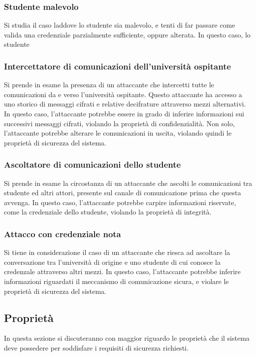 \documentclass[a4paper,12pt]{article}
\begin{document}
\subsubsection{Studente malevolo}
Si studia il caso laddove lo studente sia malevolo, e tenti di far passare come valida una credenziale parzialmente sufficiente, oppure alterata. In questo caso, lo studente 
\subsubsection{Intercettatore di comunicazioni dell'università ospitante}
Si prende in esame la presenza di un attaccante che intercetti tutte le comunicazioni da e verso l'università ospitante. Questo attaccante ha accesso a uno storico di messaggi cifrati e relative decifrature attraverso mezzi alternativi. 
\newline In questo caso, l'attaccante potrebbe essere in grado di inferire informazioni sui successivi messaggi cifrati, violando la proprietà di confidenzialità. Non solo, l'attaccante potrebbe alterare le comunicazioni in uscita, violando quindi le proprietà di sicurezza del sistema.
\subsubsection{Ascoltatore di comunicazioni dello studente}
Si prende in esame la circostanza di un attaccante che ascolti le comunicazioni tra studente ed altri attori, presente sul canale di comunicazione prima che questa avvenga. In questo caso, l'attaccante potrebbe carpire informazioni riservate, come la credenziale dello studente, violando la proprietà di integrità.
\subsubsection{Attacco con credenziale nota}
Si tiene in considerazione il caso di un attaccante che riesca ad ascoltare la conversazione tra l'università di origine e uno studente di cui conosce la credenzale attraverso altri mezzi.
\newline In questo caso, l'attaccante potrebbe inferire informazioni riguardati il meccanismo di comunicazione sicura, e violare le proprietà di sicurezza del sistema. 

\subsection{Proprietà}
In questa sezione si discuteranno con maggior riguardo le proprietà che il sistema deve possedere per soddisfare i requisiti di sicurezza richiesti.
\end{document}
